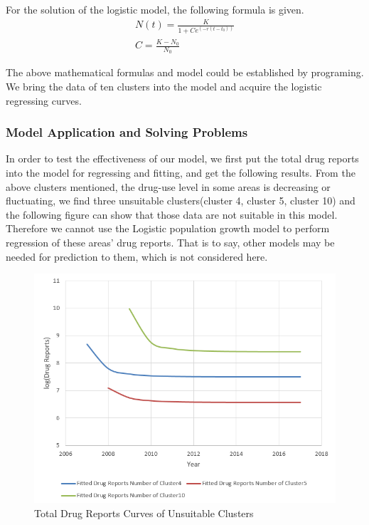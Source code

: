 \documentclass[11pt]{article}
\begin{document}
For the solution of the logistic model, the following formula is given.
\begin{gather}
	N(t)=\frac{K}{1+Ce^(-r(t-t_{0}))} \\
	C=\frac{K-N_{0}}{N_{0}} 
\end{gather}

The above mathematical formulas and model could be established by programing. We bring the data of ten clusters into the model and acquire the logistic regressing curves.

\subsubsection{Model Application and Solving Problems}
In order to test the effectiveness of our model, we first put the total drug reports into the model for regressing and fitting, and get the following results. From the above clusters mentioned, the drug-use level in some areas is decreasing or fluctuating, we find three unsuitable clusters(cluster 4, cluster 5, cluster 10) and the following figure can show that those data are not suitable in this model. Therefore we cannot use the Logistic population growth model to perform regression of these areas’ drug reports. That is to say, other models may be needed for prediction to them, which is not considered here.

\begin{figure}[H]
	\centering
	\includegraphics[scale=0.6]{./figures/1.png}
	\caption{Total Drug Reports Curves of Unsuitable Clusters}
\end{figure}
\end{document}
